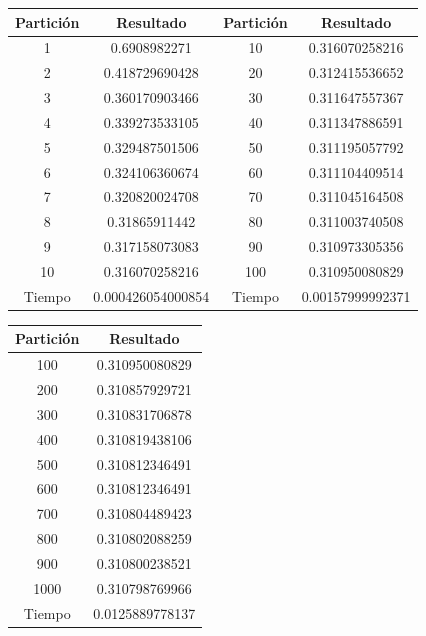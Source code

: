 \documentclass{article}
\begin{document}
     \begin{tabular}{|c|c|c|c|}
      \hline
      Partición & Resultado & Partición & Resultado\\
      \hline
      1 & 0.6908982271 & 10 & 0.316070258216\\
      \hline
      2 & 0.418729690428 & 20 & 0.312415536652\\ 
      \hline
      3 & 0.360170903466 & 30 & 0.311647557367\\
      \hline
      4 & 0.339273533105 & 40 & 0.311347886591\\
      \hline
      5 & 0.329487501506 & 50 & 0.311195057792\\
      \hline
      6 & 0.324106360674 & 60 & 0.311104409514\\
      \hline
      7 & 0.320820024708 & 70 & 0.311045164508\\
      \hline
      8 & 0.31865911442 & 80 & 0.311003740508\\
      \hline
      9 & 0.317158073083 & 90 & 0.310973305356\\
      \hline
      10 & 0.316070258216 & 100 & 0.310950080829\\
      \hline
      Tiempo & 0.000426054000854 & Tiempo & 0.00157999992371\\ \hline
     \end{tabular}

     \vspace{0.4cm}
    \begin{center}
     \begin{tabular}{|c|c|}
      \hline
      Partición & Resultado\\
      \hline
      100 & 0.310950080829\\ 
      \hline
      200 & 0.310857929721\\ 
      \hline
      300 & 0.310831706878\\ 
      \hline
      400 & 0.310819438106\\
      \hline
      500 & 0.310812346491\\
      \hline
      600 & 0.310812346491\\
      \hline
      700 & 0.310804489423\\ 
      \hline
      800 & 0.310802088259\\
      \hline
      900 & 0.310800238521\\
	  \hline
      1000 & 0.310798769966\\ 
      \hline
      Tiempo & 0.0125889778137\\ \hline
     \end{tabular} 
    \end{center}
\end{document}

